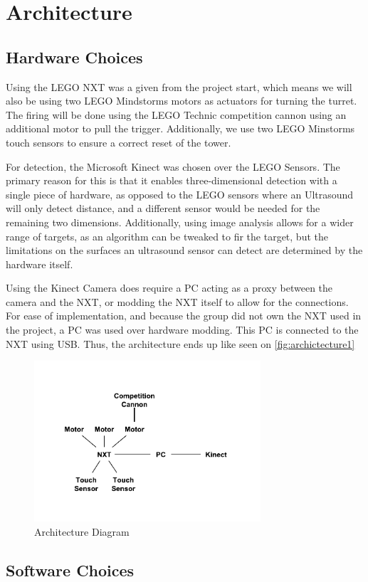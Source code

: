 \section{Architecture}

\subsection{Hardware Choices}

Using the LEGO NXT was a given from the project start, which means we will also be using two LEGO Mindstorms
motors as actuators for turning the turret. The firing will be done using the LEGO Technic competition cannon
using an additional motor to pull the trigger. Additionally, we use two LEGO Minstorms touch sensors to ensure
a correct reset of the tower.

For detection, the Microsoft Kinect was chosen over the LEGO Sensors. The primary reason for this is that
it enables three-dimensional detection with a single piece of hardware, as opposed to the LEGO sensors where
an Ultrasound will only detect distance, and a different sensor would be needed for the remaining two dimensions.
Additionally, using image analysis allows for a wider range of targets, as an algorithm can be tweaked to
fir the target, but the limitations on the surfaces an ultrasound sensor can detect are determined by the
hardware itself.

Using the Kinect Camera does require a PC acting as a proxy between the camera and the NXT, or modding the
NXT itself to allow for the connections. For ease of implementation, and because the group did not own the NXT
used in the project, a PC was used over hardware modding. This PC is connected to the NXT using USB.
Thus, the architecture ends up like seen on \autoref{fig:archictecture1}

\begin{figure}[hbtp]
\includegraphics[width=0.75\textwidth]{img/architecture1.pdf}
\caption{Architecture Diagram} 
\label{fig:archictecture1} 
\end{figure}

\subsection{Software Choices}